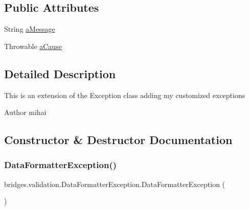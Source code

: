 \subsection*{Public Attributes}
\begin{DoxyCompactItemize}
\item 
String \mbox{\hyperlink{classbridges_1_1validation_1_1_data_formatter_exception_a8cab4688a8a80a0575bcda28e6ac7b8c}{a\+Message}}
\item 
Throwable \mbox{\hyperlink{classbridges_1_1validation_1_1_data_formatter_exception_ad2fdeb878690d9fc23f1316f55696ffd}{a\+Cause}}
\end{DoxyCompactItemize}


\subsection{Detailed Description}
This is an extension of the Exception class adding my customized exceptions \begin{DoxyAuthor}{Author}
mihai 
\end{DoxyAuthor}


\subsection{Constructor \& Destructor Documentation}
\mbox{\label{classbridges_1_1validation_1_1_data_formatter_exception_aa922b9fa359b89c0b25eaa1efd0cfd07}} 
\subsubsection{\texorpdfstring{DataFormatterException()}{DataFormatterException()}\hspace{0.1cm}{\footnotesize\ttfamily [1/4]}}
{\footnotesize\ttfamily bridges.\+validation.\+Data\+Formatter\+Exception.\+Data\+Formatter\+Exception (\begin{DoxyParamCaption}{ }\end{DoxyParamCaption})}

\mbox{\label{classbridges_1_1validation_1_1_data_formatter_exception_abadd66eb3ea98c1af1ff397912ed73bf}} 
